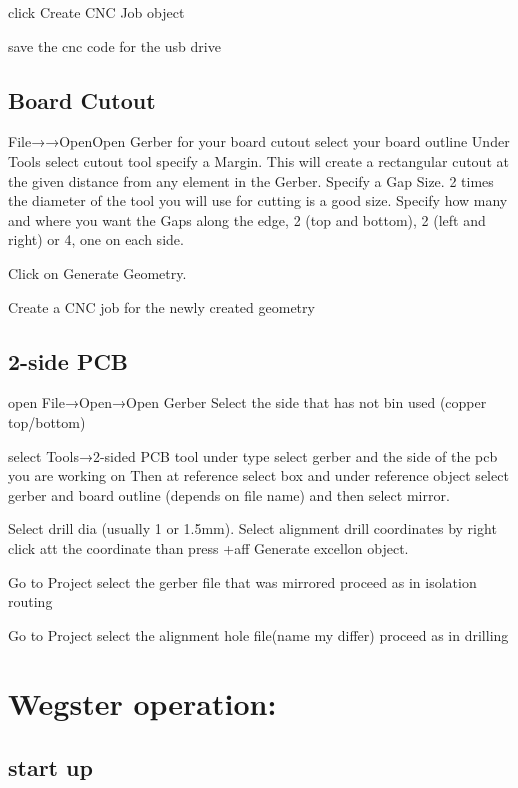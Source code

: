 \documentclass[12pt]{article}
\begin{document}
click Create CNC Job object 

save the cnc code for the usb drive 



\subsection{Board Cutout}

File→→OpenOpen Gerber for your board cutout 
select your board outline 
 Under Tools select cutout tool
specify a Margin. This will create a rectangular cutout at the given distance from any element in the Gerber. Specify a Gap Size. 2 times the diameter of the tool you will use for cutting is a good size. Specify how many and where you want the Gaps along the edge, 2 (top and bottom), 2 (left and right) or 4, one on each side.

Click on Generate Geometry.

Create a CNC job for the newly created geometry 





\subsection{2-side PCB}
open File→Open→Open Gerber Select the side that has not bin used (copper top/bottom) 

select Tools→2-sided PCB tool
under type select gerber and the side of the pcb you are working on
Then at reference select box and under reference object select gerber and board outline (depends on file name) and then select mirror.

Select drill dia (usually 1 or 1.5mm).
Select alignment drill coordinates by right click att the coordinate than press +aff 
Generate excellon object.

Go to Project select the gerber file that was mirrored proceed as in isolation routing 

Go to Project select the alignment hole file(name my differ) proceed as in drilling





\clearpage
\newpage

\section{Wegster operation:}


\subsection{start up}
\end{document}
